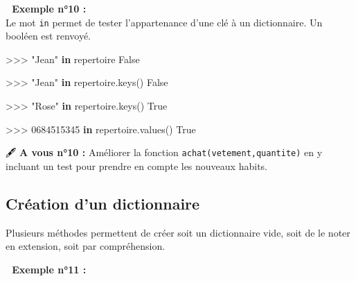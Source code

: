 \documentclass[
]{article}
\newenvironment{Shaded}{}{}
\newcommand{\KeywordTok}[1]{\textcolor[rgb]{0.00,0.44,0.13}{\textbf{#1}}}
\newcommand{\NormalTok}[1]{#1}
\newcommand{\OperatorTok}[1]{\textcolor[rgb]{0.40,0.40,0.40}{#1}}
\newcommand{\StringTok}[1]{\textcolor[rgb]{0.25,0.44,0.63}{#1}}
\newcommand{\VariableTok}[1]{\textcolor[rgb]{0.10,0.09,0.49}{#1}}
\begin{document}
\textbf{📎 Exemple n°10 :}\\
Le mot \texttt{in} permet de tester l'appartenance d'une clé à un
dictionnaire. Un booléen est renvoyé.

\begin{Shaded}
\begin{Highlighting}[]
\OperatorTok{\textgreater{}\textgreater{}\textgreater{}} \StringTok{"Jean"} \KeywordTok{in}\NormalTok{ repertoire}
\VariableTok{False}
\end{Highlighting}
\end{Shaded}

\begin{Shaded}
\begin{Highlighting}[]
\OperatorTok{\textgreater{}\textgreater{}\textgreater{}} \StringTok{"Jean"} \KeywordTok{in}\NormalTok{ repertoire.keys()}
\VariableTok{False}
\end{Highlighting}
\end{Shaded}

\begin{Shaded}
\begin{Highlighting}[]
\OperatorTok{\textgreater{}\textgreater{}\textgreater{}} \StringTok{"Rose"} \KeywordTok{in}\NormalTok{ repertoire.keys()}
\VariableTok{True}
\end{Highlighting}
\end{Shaded}

\begin{Shaded}
\begin{Highlighting}[]
\OperatorTok{\textgreater{}\textgreater{}\textgreater{}}  \StringTok{\textquotesingle{}0684515345\textquotesingle{}} \KeywordTok{in}\NormalTok{ repertoire.values()}
\VariableTok{True}
\end{Highlighting}
\end{Shaded}

🖋 \textbf{A vous n°10 :} Améliorer la fonction
\texttt{achat(vetement,quantite)} en y incluant un test pour prendre en
compte les nouveaux habits.

\hypertarget{cruxe9ation-dun-dictionnaire}{%
\subsection{Création d'un
dictionnaire}\label{cruxe9ation-dun-dictionnaire}}

Plusieurs méthodes permettent de créer soit un dictionnaire vide, soit
de le noter en extension, soit par compréhension.

\textbf{📎 Exemple n°11 :}
\end{document}
